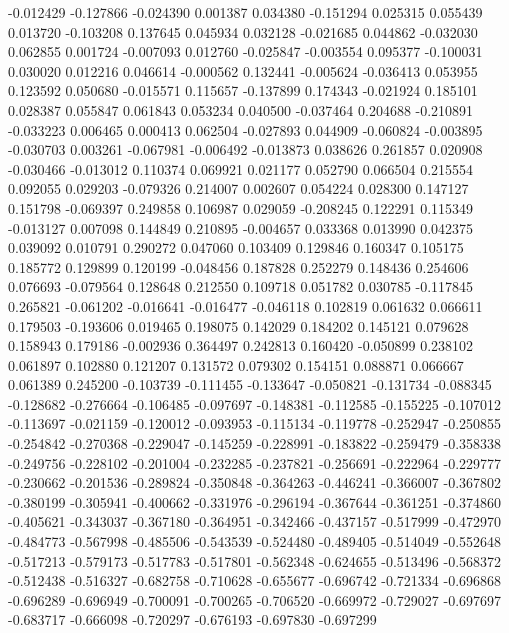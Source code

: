 -0.012429
-0.127866
-0.024390
0.001387
0.034380
-0.151294
0.025315
0.055439
0.013720
-0.103208
0.137645
0.045934
0.032128
-0.021685
0.044862
-0.032030
0.062855
0.001724
-0.007093
0.012760
-0.025847
-0.003554
0.095377
-0.100031
0.030020
0.012216
0.046614
-0.000562
0.132441
-0.005624
-0.036413
0.053955
0.123592
0.050680
-0.015571
0.115657
-0.137899
0.174343
-0.021924
0.185101
0.028387
0.055847
0.061843
0.053234
0.040500
-0.037464
0.204688
-0.210891
-0.033223
0.006465
0.000413
0.062504
-0.027893
0.044909
-0.060824
-0.003895
-0.030703
0.003261
-0.067981
-0.006492
-0.013873
0.038626
0.261857
0.020908
-0.030466
-0.013012
0.110374
0.069921
0.021177
0.052790
0.066504
0.215554
0.092055
0.029203
-0.079326
0.214007
0.002607
0.054224
0.028300
0.147127
0.151798
-0.069397
0.249858
0.106987
0.029059
-0.208245
0.122291
0.115349
-0.013127
0.007098
0.144849
0.210895
-0.004657
0.033368
0.013990
0.042375
0.039092
0.010791
0.290272
0.047060
0.103409
0.129846
0.160347
0.105175
0.185772
0.129899
0.120199
-0.048456
0.187828
0.252279
0.148436
0.254606
0.076693
-0.079564
0.128648
0.212550
0.109718
0.051782
0.030785
-0.117845
0.265821
-0.061202
-0.016641
-0.016477
-0.046118
0.102819
0.061632
0.066611
0.179503
-0.193606
0.019465
0.198075
0.142029
0.184202
0.145121
0.079628
0.158943
0.179186
-0.002936
0.364497
0.242813
0.160420
-0.050899
0.238102
0.061897
0.102880
0.121207
0.131572
0.079302
0.154151
0.088871
0.066667
0.061389
0.245200
-0.103739
-0.111455
-0.133647
-0.050821
-0.131734
-0.088345
-0.128682
-0.276664
-0.106485
-0.097697
-0.148381
-0.112585
-0.155225
-0.107012
-0.113697
-0.021159
-0.120012
-0.093953
-0.115134
-0.119778
-0.252947
-0.250855
-0.254842
-0.270368
-0.229047
-0.145259
-0.228991
-0.183822
-0.259479
-0.358338
-0.249756
-0.228102
-0.201004
-0.232285
-0.237821
-0.256691
-0.222964
-0.229777
-0.230662
-0.201536
-0.289824
-0.350848
-0.364263
-0.446241
-0.366007
-0.367802
-0.380199
-0.305941
-0.400662
-0.331976
-0.296194
-0.367644
-0.361251
-0.374860
-0.405621
-0.343037
-0.367180
-0.364951
-0.342466
-0.437157
-0.517999
-0.472970
-0.484773
-0.567998
-0.485506
-0.543539
-0.524480
-0.489405
-0.514049
-0.552648
-0.517213
-0.579173
-0.517783
-0.517801
-0.562348
-0.624655
-0.513496
-0.568372
-0.512438
-0.516327
-0.682758
-0.710628
-0.655677
-0.696742
-0.721334
-0.696868
-0.696289
-0.696949
-0.700091
-0.700265
-0.706520
-0.669972
-0.729027
-0.697697
-0.683717
-0.666098
-0.720297
-0.676193
-0.697830
-0.697299
